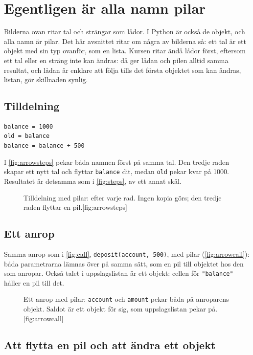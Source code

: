 \documentclass[a4paper,10pt,oneside,openright,
               oldfontcommands]{memoir}
\newcommand{\entry}[3]{%
  \begin{figure}[htbp]
    \begin{sidecaption}{#2}[fig:#1]
      #3
    \end{sidecaption}
  \end{figure}
}
\begin{document}
\section{Egentligen är alla namn pilar}

Bilderna ovan ritar tal och strängar som lådor.  I Python är också de
objekt, och alla namn är pilar.  Det här avsnittet ritar om några av
bilderna så: ett tal är ett objekt med sin typ ovanför, som en lista.
Kursen ritar ändå lådor först, eftersom ett tal eller en sträng inte
kan ändras: då ger lådan och pilen alltid samma resultat, och lådan är
enklare att följa tills det första objektet som kan ändras, listan,
gör skillnaden synlig.

\subsection{Tilldelning}

\begin{verbatim}
balance = 1000
old = balance
balance = balance + 500
\end{verbatim}
I \cref{fig:arrowsteps} pekar båda namnen först på samma tal.  Den
tredje raden skapar ett nytt tal och flyttar \texttt{balance}
dit, medan \texttt{old} pekar kvar på 1000.  Resultatet är
detsamma som i \cref{fig:steps}, av ett annat skäl.
\entry{arrowsteps}{Tilldelning med pilar: efter varje rad.  Ingen
  kopia görs; den tredje raden flyttar en pil.}{\figArrowSteps}

\subsection{Ett anrop}

Samma anrop som i \cref{fig:call}, \texttt{deposit(account,
500)}, med pilar (\cref{fig:arrowcall}): båda parametrarna lämnas över
på samma sätt, som en pil till objektet hos den som anropar.  Också
talet i uppslagslistan är ett objekt: cellen för
\texttt{"balance"} håller en pil till det.
\entry{arrowcall}{Ett anrop med pilar: \texttt{account} och
  \texttt{amount} pekar båda på anroparens objekt.  Saldot är ett objekt
  för sig, som uppslagslistan pekar på.}{\figArrowCall}

\subsection{Att flytta en pil och att ändra ett objekt}
\end{document}
